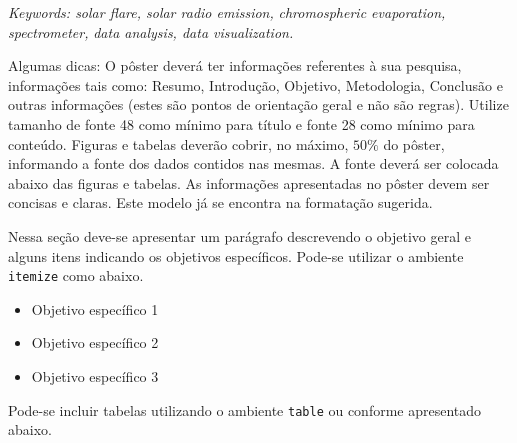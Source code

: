 \documentclass[a0paper,portrait]{baposter}
\begin{document}
\begin{poster}
{\textit{Keywords: solar flare, solar radio emission,}\newline
\textit{chromospheric evaporation, spectrometer,}\newline
\textit{data analysis, data visualization.}
}


{Algumas dicas:
O pôster deverá ter informações referentes à sua pesquisa, informações tais como: Resumo, Introdução, Objetivo, Metodologia, Conclusão e outras informações (estes são pontos de orientação geral e não são regras).
Utilize tamanho de fonte 48 como mínimo para título e fonte 28 como mínimo para conteúdo.
Figuras e tabelas deverão cobrir, no máximo, $50\%$ do pôster, informando a fonte dos dados contidos nas mesmas. A fonte deverá ser colocada abaixo das figuras e tabelas.
As informações apresentadas no pôster devem ser concisas e claras.
Este modelo já se encontra na formatação sugerida.}





{Nessa seção deve-se apresentar um parágrafo descrevendo o objetivo geral e alguns itens indicando os objetivos específicos. Pode-se utilizar o ambiente \texttt{itemize} como abaixo.

\begin{itemize}
    \item Objetivo específico 1
    \item Objetivo específico 2
    \item Objetivo específico 3
\end{itemize}

\vspace{9cm}

}

{Pode-se incluir tabelas utilizando o ambiente \texttt{table} ou conforme apresentado abaixo.

}
\end{poster}
\end{document}
